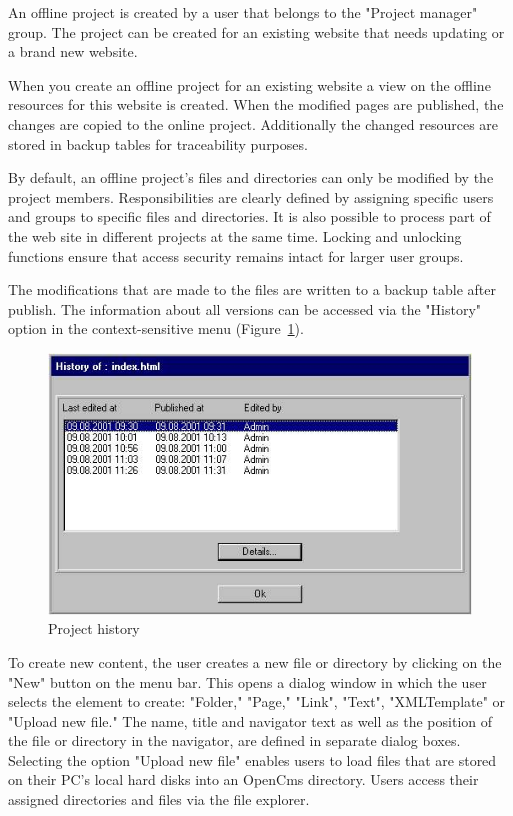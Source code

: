 An offline project is created by a user that belongs to the
"Project manager" group. The project can be created for an
existing website that needs updating or a brand new website.

When you create an offline project for an existing website a view
on the offline resources for this website is created. When the
modified pages are published, the changes are copied to the online
project. Additionally the changed resources are stored in backup
tables for traceability purposes.

By default, an offline project's files and directories can only be
modified by the project members. Responsibilities are clearly
defined by assigning specific users and groups to specific files
and directories. It is also possible to process part of the web
site in different projects at the same time. Locking and unlocking
functions ensure that access security remains intact for larger
user groups.

The modifications that are made to the files are written to a
backup table after publish. The information about all versions can
be accessed via the "History" option in the context-sensitive menu
(Figure~\ref{history01}).

\begin{figure}[hbt]
\begin{center}
\includegraphics[width=\sgw]
                   {pics/usermanual/history01}
\caption[Project history]
           {Project history}
\label{history01}
\end{center}
\end{figure}

To create new content, the user creates a new file or directory by
clicking on the "New" button on the menu bar. This opens a dialog
window in which the user selects the element to create: "Folder,"
"Page," "Link", "Text", "XMLTemplate" or "Upload new file." The
name, title and navigator text as well as the position of the file
or directory in the navigator, are defined in separate dialog
boxes. Selecting the option "Upload new file" enables users to load
files that are stored on their PC's local hard disks into an
OpenCms directory. Users access their assigned directories and
files via the file explorer.

